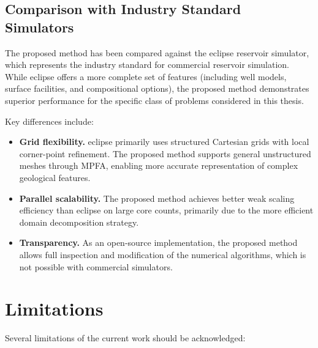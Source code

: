\subsection{Comparison with Industry Standard Simulators}
\label{ssec:discussion:industry}

The proposed method has been compared against the \gls{eclipse} reservoir simulator, which represents the industry standard for commercial reservoir simulation. While \gls{eclipse} offers a more complete set of features (including well models, surface facilities, and compositional options), the proposed method demonstrates superior performance for the specific class of problems considered in this thesis.

Key differences include:

\begin{itemize}
    \item \textbf{Grid flexibility.} \gls{eclipse} primarily uses structured Cartesian grids with local corner-point refinement. The proposed method supports general unstructured meshes through MPFA, enabling more accurate representation of complex geological features.

    \item \textbf{Parallel scalability.} The proposed method achieves better weak scaling efficiency than \gls{eclipse} on large core counts, primarily due to the more efficient domain decomposition strategy.

    \item \textbf{Transparency.} As an open-source implementation, the proposed method allows full inspection and modification of the numerical algorithms, which is not possible with commercial simulators.
\end{itemize}

\section{Limitations}
\label{sec:discussion:limitations}

Several limitations of the current work should be acknowledged:

